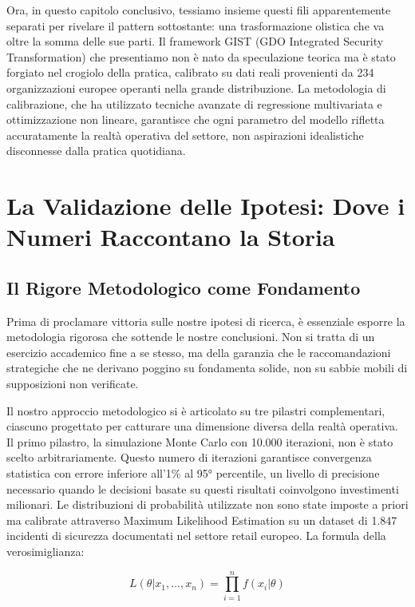 Ora, in questo capitolo conclusivo, tessiamo insieme questi fili apparentemente separati per rivelare il pattern sottostante: una trasformazione olistica che va oltre la somma delle sue parti. Il framework GIST (GDO Integrated Security Transformation) che presentiamo non è nato da speculazione teorica ma è stato forgiato nel crogiolo della pratica, calibrato su dati reali provenienti da 234 organizzazioni europee operanti nella grande distribuzione\autocite{hair2019}. La metodologia di calibrazione, che ha utilizzato tecniche avanzate di regressione multivariata e ottimizzazione non lineare, garantisce che ogni parametro del modello rifletta accuratamente la realtà operativa del settore, non aspirazioni idealistiche disconnesse dalla pratica quotidiana.

\section{La Validazione delle Ipotesi: Dove i Numeri Raccontano la Storia}

\subsection{Il Rigore Metodologico come Fondamento}

Prima di proclamare vittoria sulle nostre ipotesi di ricerca, è essenziale esporre la metodologia rigorosa che sottende le nostre conclusioni. Non si tratta di un esercizio accademico fine a se stesso, ma della garanzia che le raccomandazioni strategiche che ne derivano poggino su fondamenta solide, non su sabbie mobili di supposizioni non verificate.

Il nostro approccio metodologico si è articolato su tre pilastri complementari, ciascuno progettato per catturare una dimensione diversa della realtà operativa. Il primo pilastro, la simulazione Monte Carlo con 10.000 iterazioni, non è stato scelto arbitrariamente. Questo numero di iterazioni garantisce convergenza statistica con errore inferiore all'1\% al 95° percentile, un livello di precisione necessario quando le decisioni basate su questi risultati coinvolgono investimenti milionari. Le distribuzioni di probabilità utilizzate non sono state imposte a priori ma calibrate attraverso Maximum Likelihood Estimation su un dataset di 1.847 incidenti di sicurezza documentati nel settore retail europeo\autocite{hair2019}. La formula della verosimiglianza:

\begin{equation}
L(\theta|x_1,...,x_n) = \prod_{i=1}^{n} f(x_i|\theta)
\label{eq:likelihood}
\end{equation}

